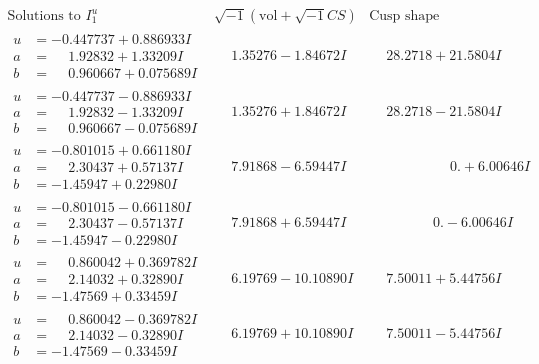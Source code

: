 \documentclass[1p]{elsarticle_modified}
\theoremstyle{definition}
\newcommand{\I}{\sqrt{-1}}
\begin{document}
$$\begin{array}{c|c|c}  
\text{Solutions to }I^u_{1}& \I (\text{vol} + \sqrt{-1}CS) & \text{Cusp shape}\\
 \hline 
\begin{aligned}
u &= -0.447737 + 0.886933 I \\
a &= \phantom{-}1.92832 + 1.33209 I \\
b &= \phantom{-}0.960667 + 0.075689 I\end{aligned}
 & \phantom{-}1.35276 - 1.84672 I & \phantom{-}28.2718 + 21.5804 I \\ \hline\begin{aligned}
u &= -0.447737 - 0.886933 I \\
a &= \phantom{-}1.92832 - 1.33209 I \\
b &= \phantom{-}0.960667 - 0.075689 I\end{aligned}
 & \phantom{-}1.35276 + 1.84672 I & \phantom{-}28.2718 - 21.5804 I \\ \hline\begin{aligned}
u &= -0.801015 + 0.661180 I \\
a &= \phantom{-}2.30437 + 0.57137 I \\
b &= -1.45947 + 0.22980 I\end{aligned}
 & \phantom{-}7.91868 - 6.59447 I & \phantom{-0.000000 -}0. + 6.00646 I \\ \hline\begin{aligned}
u &= -0.801015 - 0.661180 I \\
a &= \phantom{-}2.30437 - 0.57137 I \\
b &= -1.45947 - 0.22980 I\end{aligned}
 & \phantom{-}7.91868 + 6.59447 I & \phantom{-0.000000 } 0. - 6.00646 I \\ \hline\begin{aligned}
u &= \phantom{-}0.860042 + 0.369782 I \\
a &= \phantom{-}2.14032 + 0.32890 I \\
b &= -1.47569 + 0.33459 I\end{aligned}
 & \phantom{-}6.19769 - 10.10890 I & \phantom{-}7.50011 + 5.44756 I \\ \hline\begin{aligned}
u &= \phantom{-}0.860042 - 0.369782 I \\
a &= \phantom{-}2.14032 - 0.32890 I \\
b &= -1.47569 - 0.33459 I\end{aligned}
 & \phantom{-}6.19769 + 10.10890 I & \phantom{-}7.50011 - 5.44756 I \\ \hline\begin{aligned}

\end{aligned}
\end{array}$$
\end{document}
